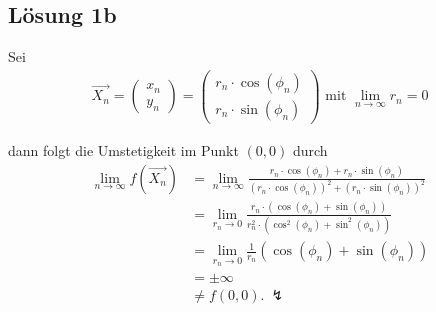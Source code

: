 \documentclass[main.tex]{subfiles}
\begin{document}
\subsection{Lösung 1b}
Sei
\begin{align*}
    \vec{X_n} = \begin{pmatrix}x_n \\ y_n \end{pmatrix}
    = \begin{pmatrix}
        r_n\cdot \cos (\phi_n) \\
        r_n\cdot \sin (\phi_n)
    \end{pmatrix} \text{ mit } \lim_{n\rightarrow \infty} r_n = 0
\end{align*}

dann folgt die Umstetigkeit im Punkt $(0,0)$ durch
\begin{align*}
    \lim_{n\rightarrow \infty} f(\vec{X_n})
        &= \lim_{n\rightarrow \infty} \frac{
                r_n\cdot \cos (\phi_n) + r_n\cdot \sin (\phi_n)
            }{
                (r_n\cdot \cos (\phi_n))^2+(r_n\cdot \sin (\phi_n))^2
            }\\
        &= \lim_{r_n\rightarrow 0} \frac{
                r_n \cdot \left( \cos (\phi_n) + \sin (\phi_n)\right)
            }{
                r_n^2 \cdot \left( \cos^2 (\phi_n) + \sin^2 (\phi_n) \right)
            }\\
        &= \lim_{r_n\rightarrow 0} \frac{1}{r_n}
                \left( \cos (\phi_n) + \sin (\phi_n)\right) \\
        &= \pm \infty \\
        &\neq f(0,0). \ \lightning
\end{align*}
\end{document}
